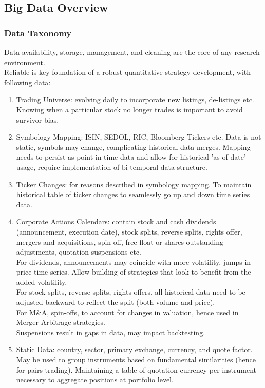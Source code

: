\subsection{Big Data Overview}


\subsubsection{Data Taxonomy}

Data availability, storage, management, and cleaning are the core of any research environment.\\

Reliable  is key foundation of a robust quantitative strategy development, with following data:
\begin{enumerate}[label=\roman*.]
\setlength{\itemsep}{0pt}
\item Trading Universe: evolving daily to incorporate new listings, de-listings etc. Knowing when a particular stock no longer trades is important to avoid survivor bias.
\item Symbology Mapping: ISIN, SEDOL, RIC, Bloomberg Tickers etc. Data is not static, symbols may change, complicating historical data merges. Mapping needs to persist as point-in-time data and allow for historical 'as-of-date' usage, require implementation of bi-temporal data structure. 
\item Ticker Changes: for reasons described in symbology mapping. To maintain historical table of ticker changes to seamlessly go up and down time series data.
\item Corporate Actions Calendars: contain stock and cash dividends (announcement, execution date), stock splits, reverse splits, rights offer, mergers and acquisitions, spin off, free float or shares outstanding adjustments, quotation suspensions etc.\\
For dividends, announcements may coincide with more volatility, jumps in price time series. Allow building of strategies that look to benefit from the added volatility.\\
For stock splits, reverse splits, rights offers, all historical data need to be adjusted backward to reflect the split (both volume and price).\\
For M\&A, spin-offs, to account for changes in valuation, hence used in Merger Arbitrage strategies.\\
Suspensions result in gaps in data, may impact backtesting.
\item Static Data: country, sector, primary exchange, currency, and quote factor. May be used to group instruments based on fundamental similarities (hence for pairs trading). Maintaining a table of quotation currency per instrument necessary to aggregate positions at portfolio level.

\end{enumerate}
